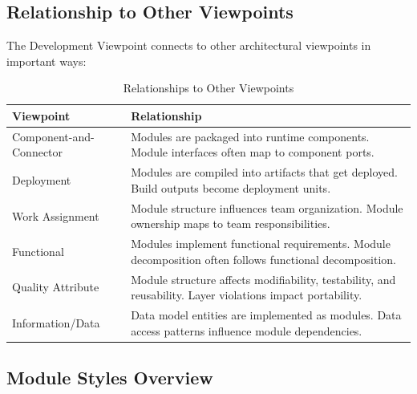 \documentclass[11pt,letterpaper]{article}
\begin{document}
\subsection{Relationship to Other Viewpoints}

The Development Viewpoint connects to other architectural viewpoints in important ways:

\begin{table}[H]
\centering
\caption{Relationships to Other Viewpoints}
\begin{tabular}{@{}L{3.5cm}L{10.5cm}@{}}
\toprule
\textbf{Viewpoint} & \textbf{Relationship} \\
\midrule
Component-and-Connector & Modules are packaged into runtime components. Module interfaces often map to component ports. \\
\addlinespace
Deployment & Modules are compiled into artifacts that get deployed. Build outputs become deployment units. \\
\addlinespace
Work Assignment & Module structure influences team organization. Module ownership maps to team responsibilities. \\
\addlinespace
Functional & Modules implement functional requirements. Module decomposition often follows functional decomposition. \\
\addlinespace
Quality Attribute & Module structure affects modifiability, testability, and reusability. Layer violations impact portability. \\
\addlinespace
Information/Data & Data model entities are implemented as modules. Data access patterns influence module dependencies. \\
\bottomrule
\end{tabular}
\end{table}

\subsection{Module Styles Overview}
\end{document}
